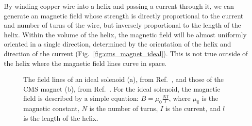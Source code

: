 By winding copper wire into a helix and passing a current through it, we can generate an magnetic field whose strength is directly proportional to the current and number of turns of the wire, but inversely proportional to the length of the helix. 
Within the volume of the helix, the magnetic field will be almost uniformly oriented in a single direction, determined by the orientation of the helix and direction of the current (Fig.~\ref{fig:cms_magnet_ideal}). 
This is not true outside of the helix where the magnetic field lines curve in space. 

\begin{figure}[htb]
    \centering
    \quad
    \caption[The field lines of an ideal solenoid and those of the CMS magnet, from Ref.~\cite{CMS:2009moq}]{
        The field lines of an ideal solenoid (a), from Ref.~\cite{SolenoidFieldLines}, and those of the CMS magnet (b), from Ref.~\cite{CMS:2009moq}. 
        For the ideal solenoid, the magnetic field is described by a simple equation: $B = \mu_0\frac{NI}{l}$, where $\mu_0$ is the magnetic constant, $N$ is the number of turns, $I$ is the current, and $l$ is the length of the helix. 
    }
    \label{fig:cms_fields}
\end{figure}

